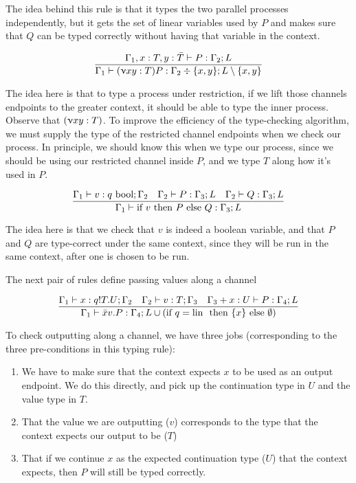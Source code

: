 The idea behind this rule is that it types the two parallel processes independently, but it gets the set of linear variables used by $P$ and makes sure that $Q$ can be typed correctly without having that variable in the context.

$$
\frac{\Gamma_1, x : T, y : \bar{T} \vdash P : \Gamma_2 ; L}{\Gamma_1 \vdash (\upnu xy : T) P : \Gamma_2 \div \{x,y\} ; L \setminus \{x,y\}}
$$

The idea here is that to type a process under restriction, if we lift those channels endpoints to the greater context, it should be able to type the inner process. Observe that $(\upnu xy : T)$. To improve the efficiency of the type-checking algorithm, we must supply the type of the restricted channel endpoints when we check our process. In principle, we should know this when we type our process, since we should be using our restricted channel inside $P$, and we type $T$ along how it's used in $P$.


$$
\frac{\Gamma_1 \vdash v : q\  \text{bool} ; \Gamma_2 \quad \Gamma_2 \vdash P : \Gamma_3 ; L \quad \Gamma_2 \vdash Q : \Gamma_3 ; L}{\Gamma_1 \vdash \text{if } v \text{ then } P \text{ else } Q : \Gamma_3 ; L}
$$

The idea here is that we check that $v$ is indeed a boolean variable, and that $P$ and $Q$ are type-correct under the same context, since they will be run in the same context, after one is chosen to be run.



The next pair of rules define passing values along a channel

$$
\frac{\Gamma_1 \vdash x : q ! T . U ; \Gamma_2 \quad \Gamma_2 \vdash v : T ; \Gamma_3 \quad \Gamma_3 + x : U \vdash P : \Gamma_4 ; L}{\Gamma_1 \vdash \bar{x}v.P : \Gamma_4 ; L \cup (\text{if } q = \text{lin } \text{ then } \{x\} \text{ else } \emptyset)} \\
$$

To check outputting along a channel, we have three jobs (corresponding to the three pre-conditions in this typing rule):
\begin{enumerate}
    \item We have to make sure that the context expects $x$ to be used as an output endpoint. We do this directly, and pick up the continuation type in $U$ and the value type in $T$.
    \item That the value we are outputting ($v$) corresponds to the type that the context expects our output to be ($T$)
    \item That if we continue $x$ as the expected continuation type ($U$) that the context expects, then $P$ will still be typed correctly.
\end{enumerate}

